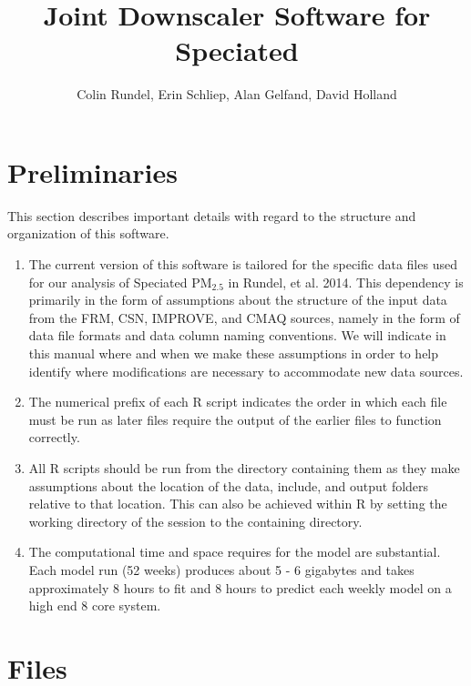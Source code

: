 \documentclass[11pt]{article}
\title{Joint Downscaler Software for Speciated \PM}
\author{Colin Rundel, Erin Schliep, Alan Gelfand, David Holland}
\newcommand{\PM}{$\text{PM}_{2.5}$ }
\begin{document}
\maketitle

\tableofcontents

\pagebreak

\section{Preliminaries}

This section describes important details with regard to the structure and organization of this software. 

\begin{enumerate}

\item The current version of this software is tailored for the specific data files used for our analysis of Speciated \PM in Rundel, et al. 2014. This dependency is primarily in the form of assumptions about the structure of the input data from the FRM, CSN, IMPROVE, and CMAQ sources, namely in the form of data file formats and data column naming conventions. We will indicate in this manual where and when we make these assumptions in order to help identify where modifications are necessary to accommodate new data sources.

\item The numerical prefix of each R script indicates the order in which each file must be run as later files require the output of the earlier files to function correctly.

\item All R scripts should be run from the directory containing them as they make assumptions about the location of the data, include, and output folders relative to that location. This can also be achieved within R by setting the working directory of the session to the containing directory.

\item The computational time and space requires for the model are substantial. Each model run (52 weeks) produces about 5 - 6 gigabytes and takes approximately 8 hours to fit and 8 hours to predict each weekly model on a high end 8 core system.

\end{enumerate}



\section{Files}
\end{document}

